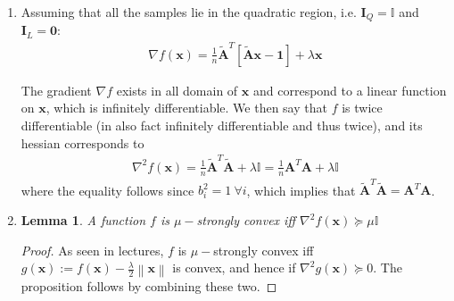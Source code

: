 \documentclass[letterpaper]{article}
\providecommand{\xx}{\mathbf{x}}
\providecommand{\1}{\mathbf{1}}
\providecommand{\0}{\mathbf{0}}
\providecommand{\mA}{\mathbf{A}}
\providecommand{\mI}{\mathbf{I}}
\providecommand{\norm}[1]{\ensuremath{\left\lVert#1\right\rVert}}
\newtheorem{lemma}{Lemma}
\begin{document}
\begin{enumerate}[label=(\alph*)]
    Using the fact that $\lambda\mathbf{I} + \frac{1}{n}\tilde{\mA}^T \mI_Q \tilde{\mA} = \lambda\mathbf{I} + \frac{1}{n}\tilde{\mA}^T \tilde{\mA}$ given in the problem statement and using the triangle inequality, we get that
    \begin{align}
        \norm{\lambda\mathbf{I} + \frac{1}{n}\tilde{\mA}^T \mI_Q \tilde{\mA}} &=\norm{\lambda\mathbf{I} + \frac{1}{n}\tilde{\mA}^T \tilde{\mA}} := \max_{\xx:\norm{\xx}=1} \norm{\left( \lambda\mathbf{I} + \frac{1}{n}\tilde{\mA}^T \tilde{\mA} \right) \xx} \\
        &\leq |\lambda| \max_{\xx:\norm{\xx}=1} \norm{\xx}  +\frac{1}{n} \max_{\xx:\norm{\xx}=1}  \norm{\tilde{\mA}^T \tilde{\mA}\xx}
        := \lambda + \frac{1}{n}\norm{\tilde{\mA}^T \tilde{\mA}} \\
        &\leq \lambda + \frac{1}{n}\norm{\tilde{\mA}^T} \norm{\tilde{\mA}}
    \end{align}
    where the last inequality again follows from definition of the spectral norm and I assume that $\lambda$ is non-negative. The proof is completed using the fact that $\norm{\tilde{\mA}}=\norm{\mA}$ and $\norm{\tilde{\mA}^T}=\norm{\mA^T}$.
    
    \item Assuming that all the samples lie in the quadratic region, i.e. $\mI_Q = \mathbb{I}$ and $\mI_L=\0$:
    \begin{align}
        \nabla f(\xx) = \frac{1}{n} \tilde{\mA}^T [\tilde{\mA} \xx - \1] + \lambda \xx
    \end{align}
    
    The gradient $\nabla f$ exists in all domain of $\xx$ and correspond to a linear function on $\xx$, which is infinitely differentiable. We then say that $f$ is twice differentiable (in also fact infinitely differentiable and thus twice), and its hessian corresponds to
    \begin{align}
        \nabla^2 f(\xx) = \frac{1}{n} \tilde{\mA}^T \tilde{\mA} + \lambda\mathbb{I}=\frac{1}{n}\mA^T \mA + \lambda\mathbb{I}
    \end{align}
    where the equality follows since $b_i^2 = 1 \ \forall i$, which implies that $\tilde{\mA}^T \tilde{\mA} = \mA^T \mA$.
    
    \item 
    \begin{lemma}
        A function $f$ is $\mu-$strongly convex iff $\nabla^2 f(\xx) \succeq \mu \mathbb{I}$
        \label{prop:1}
    \end{lemma}
    \begin{proof}
        As seen in lectures, $f$ is $\mu-$strongly convex iff $g(\xx):=f(\xx)-\frac{\lambda}{2}\norm{\xx}$ is convex, and hence if $\nabla^2g(\xx) \succeq 0$. The proposition follows by combining these two.
    \end{proof}
    

\end{enumerate}
\end{document}
